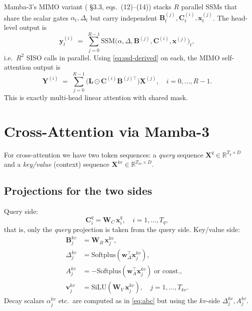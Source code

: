 \documentclass[11pt,a4paper]{article}
\begin{document}
Mamba-3's MIMO variant (\cite{mamba3} \S 3.3, eqs.~(12)–(14))
stacks $R$ parallel SSMs that share the scalar gates $\alpha_t,\Delta_t$
but carry independent $\bm{B}_t^{(j)},\bm{C}_t^{(i)},\bm{x}_t^{(j)}$.
The head-level output is
\begin{equation}
  \bm{y}_t^{(i)} \;=\; \sum_{j=0}^{R-1}\mathrm{SSM}\bigl(\alpha,\Delta,\bm{B}^{(j)},\bm{C}^{(i)},\bm{x}^{(j)}\bigr)_t,
\end{equation}
i.e.\ $R^2$ SISO calls in parallel. Using \eqref{eq:ssd-derived} on
each, the MIMO self-attention output is
\begin{equation}\label{eq:mimo-self}
  \bm{Y}^{(i)} \;=\; \sum_{j=0}^{R-1}
     \bigl(\bm{L}\odot \bm{C}^{(i)}\bm{B}^{(j)\top}\bigr)\bm{X}^{(j)},
  \quad i=0,\dots,R-1.
\end{equation}
This is exactly multi-head linear attention with shared mask.

\section{Cross-Attention via Mamba-3}
\label{sec:cross}

For cross-attention we have two token sequences: a \emph{query}
sequence $\bm{X}^{q}\in\mathbb{R}^{T_q\times D}$ and a \emph{key/value}
(context) sequence $\bm{X}^{kv}\in\mathbb{R}^{T_{kv}\times D}$.

\subsection{Projections for the two sides}

Query side:
\begin{equation}\label{eq:cross-proj-q}
  \bm{C}_i^{q} = \bm{W}_C\,\bm{x}_i^{q},
  \quad i=1,\dots,T_q,
\end{equation}
that is, only the \emph{query} projection is taken from the query
side. Key/value side:
\begin{align}
  \bm{B}_j^{kv} &= \bm{W}_B\,\bm{x}_j^{kv}, \\
  \Delta_j^{kv} &= \mathrm{Softplus}(\bm{w}_\Delta^\top \bm{x}_j^{kv}), \\
  A_j^{kv}      &= -\mathrm{Softplus}(\bm{w}_A^\top \bm{x}_j^{kv})\;\text{or const.}, \\
  \bm{v}_j^{kv} &= \mathrm{SiLU}(\bm{W}_V\,\bm{x}_j^{kv}),
  \quad j=1,\dots,T_{kv}.
\end{align}
Decay scalars $\alpha_j^{kv}$ etc.\ are computed as in \eqref{eq:abc}
but using the $kv$-side $\Delta_j^{kv}, A_j^{kv}$.
\end{document}
